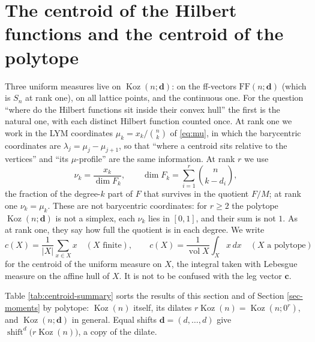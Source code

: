 \documentclass[11pt, a4paper, abstract=yes]{scrartcl}
\theoremstyle{definition}
\theoremstyle{remark}
\theoremstyle{plain}
\newcommand{\vek}[1]{\boldsymbol{#1}}
\theoremstyle{remark}
\theoremstyle{plain}
\newcommand{\Koz}{\operatorname{Koz}}
\newcommand{\shift}{\operatorname{shift}}
\newcommand{\FF}{\mathrm{FF}}
\newcommand{\vol}{\operatorname{vol}}
\begin{document}
\section{The centroid of the Hilbert functions and the centroid of the polytope}
\label{sec-centroid}
Three uniform measures live on \(\Koz(n;\vek d)\): on the ff-vectors \(\FF(n;\vek d)\) (which is
\(S_n\) at rank one), on all lattice points, and the continuous one. For the question ``where do the
Hilbert functions sit inside their convex hull'' the first is the natural one, with each distinct
Hilbert function counted once. At rank one we work in the LYM coordinates
\(\mu_k=x_k/\binom nk\) of \eqref{eq:mu}, in which the barycentric coordinates are \(\lambda_j=\mu_j-\mu_{j+1}\), so that
``where a centroid sits relative to the vertices'' and ``its \(\mu\)-profile'' are the same information.
At rank \(r\) we use
\begin{equation}\label{eq:nu}
  \nu_k=\frac{x_k}{\dim F_k},\qquad \dim F_k=\sum_{i=1}^r\binom n{k-d_i},
\end{equation}
the fraction of the degree-\(k\) part of \(F\) that survives in the quotient \(F/M\); at rank one
\(\nu_k=\mu_k\). These are not barycentric coordinates: for \(r\ge2\) the polytope
\(\Koz(n;\vek d)\) is not a simplex, each \(\nu_k\) lies in \([0,1]\), and their sum is not \(1\). As
at rank one, they say how full the quotient is in each degree. We write
\begin{equation}\label{eq:centroid}
  c(X)=\frac1{\lvert X\rvert}\sum_{x\in X}x\quad(X\text{ finite}),\qquad
  c(X)=\frac1{\vol X}\int_Xx\,dx\quad(X\text{ a polytope})
\end{equation}
for the centroid of the uniform measure on \(X\), the integral taken with Lebesgue measure on the
affine hull of \(X\). It is not to be confused with the leg vector \(\vek c\).

Table \ref{tab:centroid-summary} sorts the results of this section and of Section \ref{sec-moments} by
polytope: \(\Koz(n)\) itself, its dilates \(r\Koz(n)=\Koz(n;0^r)\), and \(\Koz(n;\vek d)\) in general.
Equal shifts \(\vek d=(d,\dots,d)\) give \(\shift^d\bigl(r\Koz(n)\bigr)\), a copy of the dilate.
\end{document}
